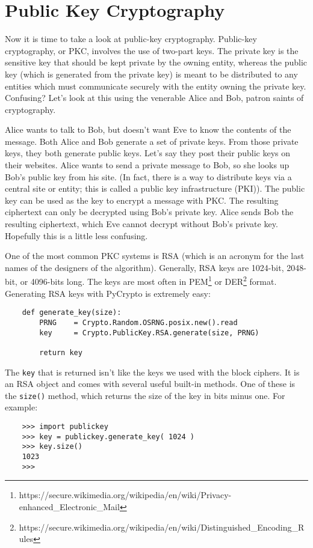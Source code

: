 \documentclass[letterpaper,10pt]{article}
\begin{document}
\section{Public Key Cryptography}
Now it is time to take a look at public-key cryptography. Public-key 
cryptography, or PKC, involves the use of two-part keys. The private key is
the sensitive key that should be kept private by the owning entity, whereas the
public key (which is generated from the private key) is meant to be distributed
to any entities which must communicate securely with the entity owning the 
private key. Confusing? Let's look at this using the venerable Alice and Bob,
patron saints of cryptography.

Alice wants to talk to Bob, but doesn't want Eve to know the contents of the
message. Both Alice and Bob generate a set of private keys. From those private
keys, they both generate public keys. Let's say they post their public keys on
their websites. Alice wants to send a private message to Bob, so she looks up
Bob's public key from his site. (In fact, there is a way to distribute keys via
a central site or entity; this is called a public key infrastructure (PKI)). The 
public key can be used as the key to encrypt a message with PKC. The resulting 
ciphertext can only be decrypted using Bob's private key. Alice sends Bob the 
resulting ciphertext, which Eve cannot decrypt without Bob's private key. 
Hopefully this is a little less confusing. 

One of the most common PKC systems is RSA (which is an acronym for the last 
names of the designers of the algorithm). Generally, RSA keys are 1024-bit,
2048-bit, or 4096-bits long. The keys are most often in 
PEM\footnote{https://secure.wikimedia.org/wikipedia/en/wiki/Privacy-enhanced\_Electronic\_Mail} 
or 
DER\footnote{https://secure.wikimedia.org/wikipedia/en/wiki/Distinguished\_Encoding\_Rules}
format. Generating RSA keys with PyCrypto is extremely easy:
\begin{verbatim}
    def generate_key(size):
        PRNG    = Crypto.Random.OSRNG.posix.new().read
        key     = Crypto.PublicKey.RSA.generate(size, PRNG)

        return key
\end{verbatim}

The \texttt{key} that is returned isn't like the keys we used with the block ciphers.
It is an RSA object and comes with several useful built-in methods. One of 
these is the \texttt{size()} method, which returns the size of the key in bits minus
one. For example:
\begin{verbatim}
    >>> import publickey
    >>> key = publickey.generate_key( 1024 )
    >>> key.size()
    1023
    >>>
\end{verbatim}
\end{document}
